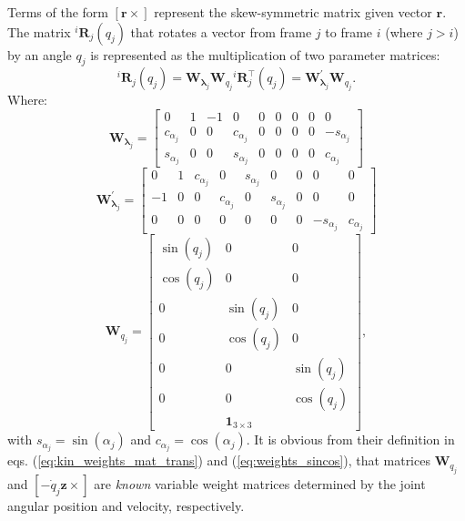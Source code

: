Terms of the form $[\bm{r}\times]$ represent the skew-symmetric matrix given vector $\bm{r}$. The matrix $^{i}\bm{R}_j(q_j)$ that rotates a vector from frame $j$ to frame $i$ (where $j>i$) by an angle $q_j$ is represented as the multiplication of two parameter matrices:
\begin{subequations}
\begin{equation}
^{i}\bm{R}_j(q_j)=\bm{W}_{\bm{\lambda}_j}\bm{W}_{q_j}
\label{eq:rot_mat_def}
\end{equation}
\begin{equation}
^{i}\bm{R}^\intercal_j(q_j)=\bm{W}^\prime_{\bm{\lambda}_j}\bm{W}_{q_j}.
\label{eq:rot_mat_trans_def}
\end{equation}
\end{subequations}
Where:
\begin{equation}
\bm{W}_{\bm{\lambda}_j}= \begin{bmatrix}
0 & 1 & -1 & 0 & 0 & 0 & 0 & 0 & 0\\
c_{\alpha_j} & 0 & 0 & c_{\alpha_j} & 0 & 0 & 0 & 0 & -s_{\alpha_j}\\
s_{\alpha_j}&0&0&s_{\alpha_j}& 0 & 0 & 0 & 0 & c_{\alpha_j}\end{bmatrix}
\label{eq:kin_weights_mat}
\end{equation}
\begin{equation}
\bm{W}^\prime_{\bm{\lambda}_j}=
 \begin{bmatrix}
0 & 1 & c_{\alpha_j} & 0 & s_{\alpha_j} & 0 & 0 & 0 & 0\\
-1 & 0 & 0 & c_{\alpha_j} & 0 & s_{\alpha_j} & 0 & 0 & 0 \\
0 & 0 & 0 & 0 & 0 & 0 & 0 & -s_{\alpha_j} & c_{\alpha_j}\end{bmatrix}
\label{eq:kin_weights_mat_trans}
\end{equation}
\begin{equation}
\bm{W}_{q_j}= \begin{bmatrix}
\sin(q_j) & 0 & 0 \\
\cos(q_j) & 0 & 0 \\
0 & \sin(q_j) & 0 \\
0 & \cos(q_j) & 0 \\
0 & 0 & \sin(q_j) \\
0 & 0 & \cos(q_j) \\
&\bm{1}_{3\times3} &\end{bmatrix},
\label{eq:weights_sincos}
\end{equation}
with $s_{\alpha_j}=\sin(\alpha_j)$ and $c_{\alpha_j}=\cos(\alpha_j)$. It is obvious from their definition in eqs. (\ref{eq:kin_weights_mat_trans}) and (\ref{eq:weights_sincos}), that matrices $\bm{W}_{q_j}$ and $[-\dot{q}_{j}\bm{z}\times]$ are \emph{known} variable weight matrices determined by the joint angular position and velocity, respectively.

